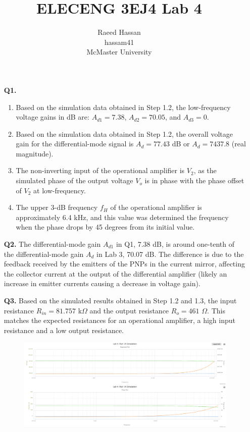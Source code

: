 \documentclass[12pt]{article}
\title{ELECENG 3EJ4 Lab 4}
\author{Raeed Hassan \\ hassam41 \\ McMaster University}
\begin{document}
\maketitle
\clearpage
\begin{itemize}
    \section*{Part 1}
    \item [\textbf{Q1.}]
    \begin{enumerate}
        \item Based on the simulation data obtained in Step 1.2, the low-frequency voltage gains in dB are: $A_{d1} = 7.38$, $A_{d2} = 70.05$, and $A_{d3} = 0$.
        \item Based on the simulation data obtained in Step 1.2, the overall voltage gain for the differential-mode signal is $A_d = 77.43$ dB or $A_d = 7437.8$ (real magnitude).
        \item The non-inverting input of the operational amplifier is $V_2$, as the simulated phase of the output voltage $V_o$ is in phase with the phase offset of $V_2$ at low-frequency.
        \item The upper 3-dB frequency $f_H$ of the operational amplifier is approximately 6.4 kHz, and this value was determined the frequency when the phase drops by 45 degrees from its initial value.
    \end{enumerate}
    \item [\textbf{Q2.}]
    The differential-mode gain $A_{d1}$ in Q1, 7.38 dB, is around one-tenth of the differential-mode gain $A_{d}$ in Lab 3, 70.07 dB. The difference is due to the feedback received by the emitters of the PNPs in the current mirror, affecting the collector current at the output of the differential amplifier (likely an increase in emitter currents causing a decrease in voltage gain).
    \item [\textbf{Q3.}]
    Based on the simulated results obtained in Step 1.2 and 1.3, the input resistance $R_{in} = 81.757$ k$\Omega$ and the output resistance $R_o = 461$ $\Omega$. This matches the expected resistances for an operational amplifier, a high input resistance and a low output resistance.
    \begin{figure}[!ht]
        \centering
        \includegraphics[width=\textwidth]{Step1.2}

\end{figure}
\end{itemize}
\end{document}
